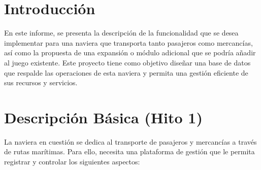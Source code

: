 \documentclass{article}
\begin{document}
\newpage
\tableofcontents
\newpage

\section{Introducción}

En este informe, se presenta la descripción de la funcionalidad que se desea implementar para una naviera que transporta tanto pasajeros como mercancías, así como la propuesta de una expansión o módulo adicional que se podría añadir al juego existente. Este proyecto tiene como objetivo diseñar una base de datos que respalde las operaciones de esta naviera y permita una gestión eficiente de sus recursos y servicios.

\section{Descripción Básica (Hito 1)}

La naviera en cuestión se dedica al transporte de pasajeros y mercancías a través de rutas marítimas. Para ello, necesita una plataforma de gestión que le permita registrar y controlar los siguientes aspectos:
\end{document}
